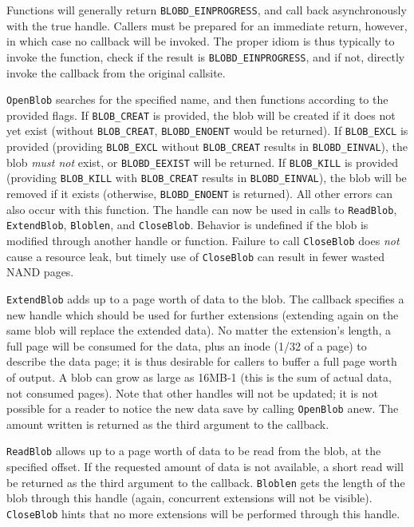 \documentclass[letterpaper,10pt]{article}
\begin{document}
Functions will generally return {\texttt{BLOBD\_EINPROGRESS}}, and call back
asynchronously with the true handle. Callers must be prepared for an immediate
return, however, in which case no callback will be invoked. The proper idiom
is thus typically to invoke the function, check if the result is
{\texttt{BLOBD\_EINPROGRESS}}, and if not, directly invoke the callback
from the original callsite.

{\texttt{OpenBlob}} searches for the specified name, and then functions according
to the provided flags. If {\texttt{BLOB\_CREAT}} is provided, the blob will be
created if it does not yet exist (without \texttt{BLOB\_CREAT}, {\texttt{BLOBD\_ENOENT}} would
be returned). If {\texttt{BLOB\_EXCL}} is provided (providing {\texttt{BLOB\_EXCL}}
without {\texttt{BLOB\_CREAT}} results in {\texttt{BLOBD\_EINVAL}}), the
blob \textit{must not} exist, or \texttt{BLOBD\_EEXIST} will be returned. If
\texttt{BLOB\_KILL} is provided (providing \texttt{BLOB\_KILL} with \texttt{BLOB\_CREAT}
results in \texttt{BLOBD\_EINVAL}), the blob will be removed if it exists (otherwise,
\texttt{BLOBD\_ENOENT} is returned). All other errors can also occur with this
function. The handle can now be used in calls to \texttt{ReadBlob}, \texttt{ExtendBlob},
\texttt{Bloblen}, and \texttt{CloseBlob}. Behavior is undefined if the blob
is modified through another handle or function. Failure to call \texttt{CloseBlob}
does \textit{not} cause a resource leak, but timely use of \texttt{CloseBlob}
can result in fewer wasted NAND pages.

\texttt{ExtendBlob} adds up to a page worth of data to the blob. The callback
specifies a new handle which should be used for further extensions (extending
again on the same blob will replace the extended data). No matter the extension's
length, a full page will be consumed for the data, plus an inode (1/32 of a page)
to describe the data page; it is thus desirable for callers to buffer a full page
worth of output. A blob can grow as large as 16MB-1 (this is the sum of actual
data, not consumed pages). Note that other handles will not be updated; it is
not possible for a reader to notice the new data save by calling \texttt{OpenBlob}
anew. The amount written is returned as the third argument to the callback.

\texttt{ReadBlob} allows up to a page worth of data to be read from the blob,
at the specified offset. If the requested amount of data is not available, a
short read will be returned as the third argument to the callback. \texttt{Bloblen}
gets the length of the blob through this handle (again, concurrent extensions
will not be visible). \texttt{CloseBlob} hints that no more extensions will
be performed through this handle.
\end{document}
